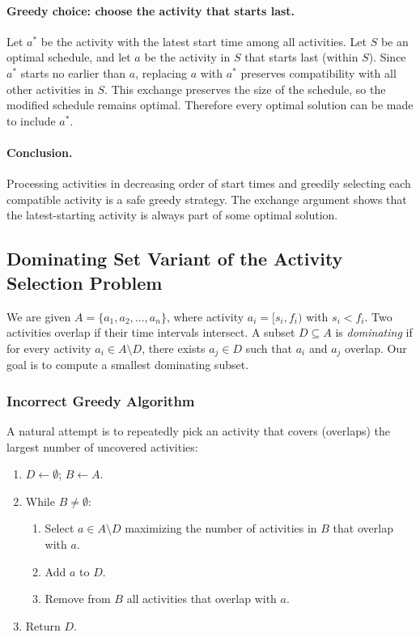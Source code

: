 \documentclass[9pt]{extarticle}
\begin{document}
\paragraph{Greedy choice: choose the activity that starts last.}
Let $a^*$ be the activity with the latest start time among all activities.  Let
$S$ be an optimal schedule, and let $a$ be the activity in $S$ that starts last
(within $S$).  Since $a^*$ starts no earlier than $a$, replacing $a$ with $a^*$
preserves compatibility with all other activities in $S$.  This exchange
preserves the size of the schedule, so the modified schedule remains optimal.
Therefore every optimal solution can be made to include $a^*$.

\paragraph{Conclusion.}
Processing activities in decreasing order of start times and greedily selecting
each compatible activity is a safe greedy strategy.  The exchange argument shows
that the latest-starting activity is always part of some optimal solution.
\subsection{Dominating Set Variant of the Activity Selection Problem}

We are given \(A = \{a_1, a_2, \ldots, a_n\}\), where activity
\(a_i = [s_i, f_i)\) with \(s_i < f_i\).
Two activities overlap if their time intervals intersect. 
A subset \(D \subseteq A\) is \emph{dominating} if for every activity
\(a_i \in A \setminus D\), there exists \(a_j \in D\) such that 
\(a_i\) and \(a_j\) overlap.
Our goal is to compute a smallest dominating subset.

\subsubsection*{Incorrect Greedy Algorithm}
A natural attempt is to repeatedly pick an activity that covers (overlaps)
the largest number of uncovered activities:
\begin{enumerate}
    \item \(D \leftarrow \emptyset\); \(B \leftarrow A\).
    \item While \(B \neq \emptyset\):
    \begin{enumerate}
        \item Select \(a \in A \setminus D\) maximizing the number of activities
              in \(B\) that overlap with \(a\).
        \item Add \(a\) to \(D\).
        \item Remove from \(B\) all activities that overlap with \(a\).
    \end{enumerate}
    \item Return \(D\).
\end{enumerate}
\end{document}
